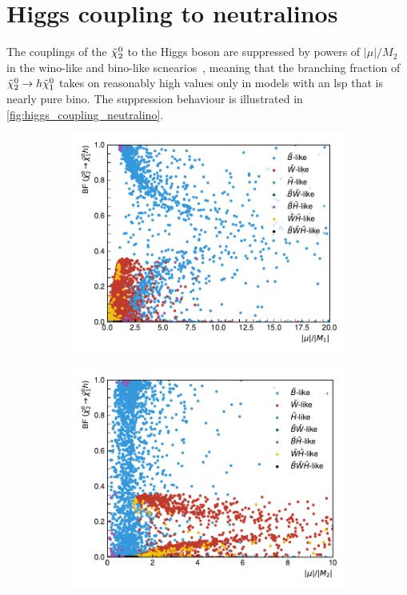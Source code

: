 \FloatBarrier

\section{Higgs coupling to neutralinos}

The couplings of the $\tilde{\chi}_2^0$ to the Higgs boson are suppressed by powers of $\vert\mu\vert/M_2$ in the wino-like and bino-like scnearios~\cite{Arbey:2012fa}, meaning that the branching fraction of $\tilde{\chi}_2^0 \rightarrow h \tilde{\chi}_1^0$ takes on reasonably high values only in models with an \gls{lsp} that is nearly pure bino. The suppression behaviour is illustrated in \cref{fig:higgs_coupling_neutralino}.

\begin{figure}[h]
	\centering
	\begin{subfigure}[b]{0.49\linewidth}
		\centering\includegraphics[width=\textwidth]{scatter/lsp_types_BR_Higgs_muM1}
		\caption{\label{fig:lsp_types_BR_Higgs_muM1}}
	\end{subfigure}\hfill
	\begin{subfigure}[b]{0.49\linewidth}
		\centering\includegraphics[width=\textwidth]{scatter/lsp_types_BR_Higgs_muM2}

\end{subfigure}
\end{figure}
